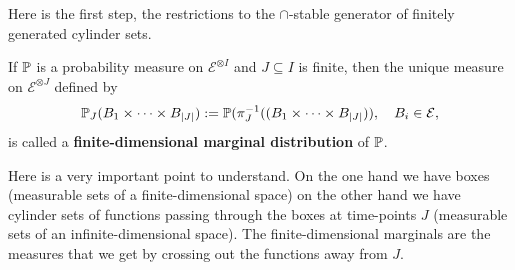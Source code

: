 Here is the first step, the restrictions to the $\cap$-stable generator of finitely generated cylinder sets.
\begin{ldef}
\begin{deff}\label{def:SL}
	If $\P$ is a probability measure on $\mathcal E^{\otimes I}$ and $J\subseteq I$ is finite, then the unique measure on $\mathcal E^{\otimes J}$ defined by
	\begin{align*}
		\P_J(B_1\times \cdots \times B_{|J|}):=\P(\pi_{J}^{-1}((B_1\times \cdots \times B_{|J|})),\quad B_i\in \mathcal E,
	\end{align*}
	is called a \textbf{finite-dimensional marginal distribution} of $\P$.
\end{deff}
\end{ldef}
Here is a very important point to understand. On the one hand we have boxes (measurable sets of a finite-dimensional space) on the other hand we have cylinder sets of functions passing through the boxes at time-points $J$ (measurable sets of an infinite-dimensional space). The finite-dimensional marginals are the measures that we get by crossing out the functions away from $J$.

